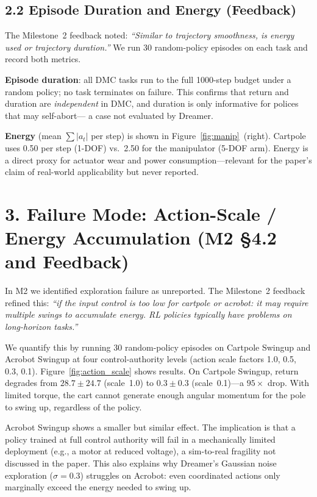 \documentclass[10pt,twocolumn]{article}
\begin{document}
\subsection{2.2 Episode Duration and Energy (Feedback)}

The Milestone~2 feedback noted: \textit{``Similar to trajectory
smoothness, is energy used or trajectory duration.''}  We run 30
random-policy episodes on each task and record both metrics.

\textbf{Episode duration}: all DMC tasks run to the full 1000-step
budget under a random policy; no task terminates on failure.  This
confirms that return and duration are \textit{independent} in DMC,
and duration is only informative for polices that may self-abort---
a case not evaluated by Dreamer.

\textbf{Energy} (mean $\sum|a_t|$ per step) is shown in
Figure~\ref{fig:manip}~(right).  Cartpole uses 0.50 per step
(1-DOF) vs.\ 2.50 for the manipulator (5-DOF arm).  Energy is a
direct proxy for actuator wear and power consumption---relevant for
the paper's claim of real-world applicability but never reported.

\section{3. Failure Mode: Action-Scale / Energy Accumulation
         (M2 \S4.2 and Feedback)}

In M2 we identified exploration failure as unreported.  The
Milestone~2 feedback refined this: \textit{``if the input control is
too low for cartpole or acrobot: it may require multiple swings to
accumulate energy. RL policies typically have problems on
long-horizon tasks.''}

We quantify this by running 30 random-policy episodes on Cartpole
Swingup and Acrobot Swingup at four control-authority levels
(action scale factors 1.0, 0.5, 0.3, 0.1).
Figure~\ref{fig:action_scale} shows results.  On Cartpole Swingup,
return degrades from $28.7\pm24.7$ (scale~1.0) to $0.3\pm0.3$
(scale~0.1)---a $95\times$ drop.  With limited torque, the cart
cannot generate enough angular momentum for the pole to swing up,
regardless of the policy.

Acrobot Swingup shows a smaller but similar effect.  The implication
is that a policy trained at full control authority will fail in a
mechanically limited deployment (e.g., a motor at reduced voltage),
a sim-to-real fragility not discussed in the paper.  This also
explains why Dreamer's Gaussian noise exploration ($\sigma{=}0.3$)
struggles on Acrobot: even coordinated actions only marginally exceed
the energy needed to swing up.
\end{document}

